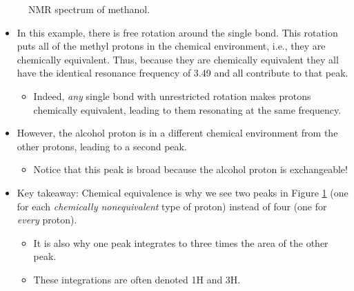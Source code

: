\documentclass[../notes.tex]{subfiles}
\begin{document}
\begin{itemize}
\begin{figure}[h!]
        \caption{ NMR spectrum of methanol.}
        \label{fig:NMRMeOH}
    \end{figure}
    \begin{itemize}
        \item In this example, there is free rotation around the  single bond. This rotation puts all of the methyl protons in the chemical environment, i.e., they are chemically equivalent. Thus, because they are chemically equivalent they all have the identical resonance frequency of 3.49 and all contribute to that peak.
        \begin{itemize}
            \item Indeed, \emph{any} single bond with unrestricted rotation makes protons chemically equivalent, leading to them resonating at the same frequency.
        \end{itemize}
        \item However, the alcohol proton is in a different chemical environment from the other protons, leading to a second peak.
        \begin{itemize}
            \item Notice that this peak is broad because the alcohol proton is exchangeable!
        \end{itemize}
        \item Key takeaway: Chemical equivalence is why we see two peaks in Figure \ref{fig:NMRMeOH} (one for each \emph{chemically nonequivalent} type of proton) instead of four (one for \emph{every} proton).
        \begin{itemize}
            \item It is also why one peak integrates to three times the area of the other peak.
            \item These integrations are often denoted 1H and 3H.
        \end{itemize}

\end{itemize}
\end{itemize}
\end{document}
